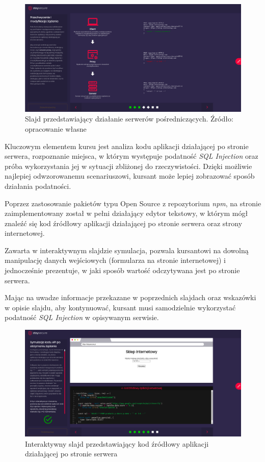 \documentclass[12pt,twoside]{article}
\begin{document}
\begin{figure}[H]
	\centering
	\includegraphics[width=1\linewidth]{figures/sql-slide-screenshot3.png}
	\caption{Slajd przedstawiający działanie serwerów pośredniczących. Źródło: opracowanie własne}
	\label{Fig:Interaktywny slajd przedstawiający budowę omawianej strony}
\end{figure} 

Kluczowym elementem kursu jest analiza kodu aplikacji działającej po stronie serwera, rozpoznanie miejsca, w którym występuje podatność \emph{SQL Injection} oraz próba wykorzystania jej w sytuacji zbliżonej do rzeczywistości. Dzięki możliwie najlepiej odwzorowanemu scenariuszowi, kursant może lepiej zobrazować sposób działania podatności.

Poprzez zastosowanie pakietów typu Open Source z repozytorium \emph{npm}, na stronie zaimplementowany został w pełni działający edytor tekstowy, w którym mógł znaleźć się kod źródłowy aplikacji działającej po stronie serwera oraz strony internetowej. 

Zawarta w interaktywnym slajdzie symulacja, pozwala kursantowi na dowolną manipulację danych wejściowych (formularza na stronie internetowej) i jednocześnie prezentuje, w jaki sposób wartość odczytywana jest po stronie serwera. 

Mając na uwadze informacje przekazane w poprzednich slajdach oraz wskazówki w opisie slajdu, aby kontynuować, kursant musi samodzielnie wykorzystać podatność \emph{SQL Injection} w opisywanym serwisie.

 
 \begin{figure}[H]
 	\centering
 	\includegraphics[width=1\linewidth]{figures/sql-slide-screenshot2.png}
 	\caption{Interaktywny slajd przedstawiający kod źródłowy aplikacji działającej po stronie serwera}
 \end{figure} 
 
\end{document}
